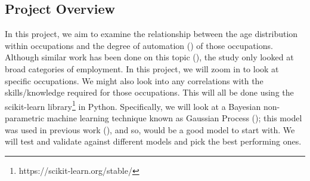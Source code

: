 \documentclass[11pt]{article}
\begin{document}
\subsection{Project Overview}
\label{subsec:projectoverview}
In this project, we aim to examine the relationship between the age distribution within occupations and the degree of automation (\cite{futureofemployment}) of those occupations. Although similar work has been done on this topic (\cite{twinthreats}), the study only looked at broad categories of employment. In this project, we will zoom in to look at specific occupations. We might also look into any correlations with the skills/knowledge required for those occupations. This will all be done using the scikit-learn library\footnote{https://scikit-learn.org/stable/} in Python. Specifically, we will look at a Bayesian non-parametric machine learning technique known as Gaussian Process (\cite{GaussianProcess}); this model was used in previous work (\cite{futureofemployment}), and so, would be a good model to start with. We will test and validate against different models and pick the best performing ones.
\end{document}
